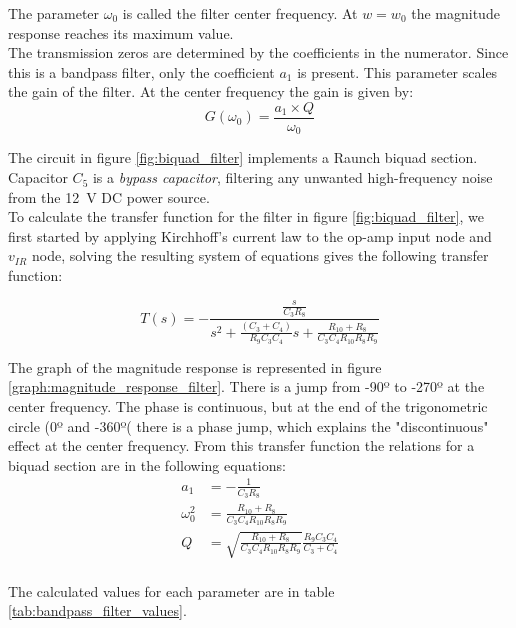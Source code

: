\documentclass[lettersize,journal]{IEEEtran}
\begin{document}
The parameter $\omega_0$ is called the filter center frequency. At $w = w_0$ the magnitude response reaches its maximum value.\\

The transmission zeros are determined by the coefficients in the numerator. Since this is a bandpass filter, only the coefficient $a_1$ is present. This parameter scales the gain of the filter. At the center frequency the gain is given by:
\begin{equation}
    G(\omega_0) = \frac{a_1 \times Q}{\omega_0}
\end{equation}

The circuit in figure \ref{fig:biquad_filter} implements a Raunch biquad section. Capacitor $C_5$ is a \textit{bypass capacitor}, filtering any unwanted high-frequency noise from the \SI{12}{\volt} DC power source.\\

To calculate the transfer function for the filter in figure \ref{fig:biquad_filter}, we first started by applying Kirchhoff's current law to the op-amp input node and $v_{IR}$ node, solving the resulting system of equations gives the following transfer function:

\begin{equation}
    T(s) = - \frac{\frac{s}{C_3 R_8}}{s^2 + \frac{(C_3 + C_4)}{R_9 C_3 C_4} s + \frac{R_{10} + R_{8}}{C_3 C_4 R_{10} R_{8} R_{9}}}
\end{equation}

The graph of the magnitude response is represented in figure \ref{graph:magnitude_response_filter}. There is a jump from -90º to -270º at the center frequency. The phase is continuous, but at the end of the trigonometric circle (0º and -360º( there is a phase jump, which explains the "discontinuous" effect at the center frequency.
From this transfer function the relations for a biquad section are in the following equations:
\begin{align}
    a_1 &= -\frac{1}{C_3 R_8} \\
    \omega_0^2 &= \frac{R_{10} + R_{8}}{C_3 C_4 R_{10} R_{8} R_{9}} \\
    Q &= \sqrt{\frac{R_{10} + R_{8}}{C_3 C_4 R_{10} R_{8} R_{9}}} \frac{R_9 C_3 C_4}{C_3 + C_4}\\
    \label{eq:biquad_transfer_function}
\end{align}

The calculated values for each parameter are in table \ref{tab:bandpass_filter_values}.\\
\end{document}
